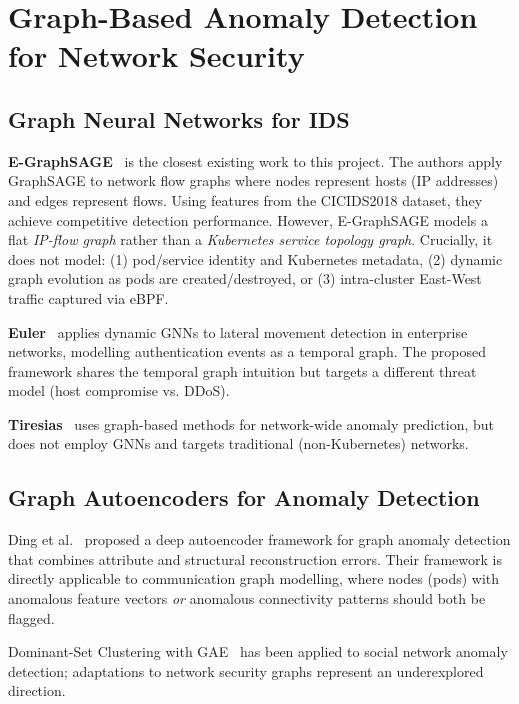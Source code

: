 \section{Graph-Based Anomaly Detection for Network Security}
\label{sec:lit_graph}

\subsection{Graph Neural Networks for IDS}

\textbf{E-GraphSAGE}~\cite{lo2022egraphsage} is the closest existing work to this
project. The authors apply GraphSAGE to network flow graphs where nodes represent
hosts (IP addresses) and edges represent flows. Using features from the CICIDS2018
dataset, they achieve competitive detection performance. However, E-GraphSAGE models a
flat \emph{IP-flow graph} rather than a \emph{Kubernetes service topology graph}.
Crucially, it does not model: (1) pod/service identity and Kubernetes metadata,
(2) dynamic graph evolution as pods are created/destroyed, or (3) intra-cluster
East-West traffic captured via eBPF.

\textbf{Euler}~\cite{euler2022} applies dynamic GNNs to lateral movement detection
in enterprise networks, modelling authentication events as a temporal graph. The
proposed framework shares the temporal graph intuition but targets a different threat
model (host compromise vs. DDoS).

\textbf{Tiresias}~\cite{tiresias2018} uses graph-based methods for network-wide
anomaly prediction, but does not employ GNNs and targets traditional (non-Kubernetes)
networks.

\subsection{Graph Autoencoders for Anomaly Detection}

Ding et al.~\cite{ding2019deep} proposed a deep autoencoder framework for graph
anomaly detection that combines attribute and structural reconstruction errors.
Their framework is directly applicable to communication graph modelling, where nodes
(pods) with anomalous feature vectors \emph{or} anomalous connectivity patterns should
both be flagged.

Dominant-Set Clustering with GAE~\cite{gae_anomaly} has been applied to social network
anomaly detection; adaptations to network security graphs represent an underexplored
direction.

